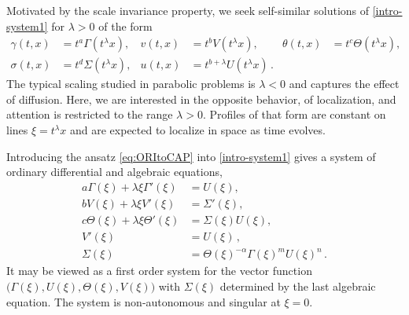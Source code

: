 \documentclass[usletter,11pt]{article}
\theoremstyle{remark}
\begin{document}
Motivated by the scale invariance property, we seek self-similar solutions of \eqref{intro-system1} for $\lambda > 0$ of the form 
\begin{equation}\label{eq:ORItoCAP}
\begin{aligned}
 \gamma(t,x) &= t^a\Gamma(t^\lambda x), & v(t,x) &= t^b V(t^\lambda x), &\theta(t,x) &= t^c \Theta(t^\lambda x),\\
 \sigma(t,x) &= t^d \Sigma(t^\lambda x), & u(t,x) &= t^{b+\lambda} U(t^\lambda x) \, .
\end{aligned}
\end{equation}
The typical scaling studied in parabolic problems  is $\lambda < 0$ and captures the effect of diffusion.
Here, we are interested in the opposite behavior, of localization, and attention is restricted to the range $\lambda>0$. 
Profiles of that form are constant on lines $\xi = t^\lambda x$ and are expected to
localize in space as time evolves.


Introducing the ansatz \eqref{eq:ORItoCAP} into \eqref{intro-system1} gives a system of ordinary differential 
and algebraic equations,
\begin{equation}
\begin{aligned}
 a \Gamma(\xi) + \lambda \xi \Gamma'(\xi) &= U(\xi),\\
 b V(\xi) + \lambda \xi V'(\xi) &= \Sigma'(\xi),\\
 c \Theta(\xi) + \lambda \xi \Theta'(\xi)&=\Sigma(\xi) U(\xi),\\
 V'(\xi)&=U(\xi) \, , \\
 \Sigma(\xi) &= \Theta(\xi)^{-\alpha} \Gamma(\xi)^m U(\xi)^n \, .
\end{aligned} \label{eq:ss-odes}
\end{equation}
It may be viewed as a first order system for the vector function $\big(\Gamma(\xi), U(\xi), \Theta(\xi), V(\xi)\big)$ with $\Sigma (\xi)$ determined by the last algebraic equation.
The system is non-autonomous and  singular at $\xi=0$.
\end{document}
